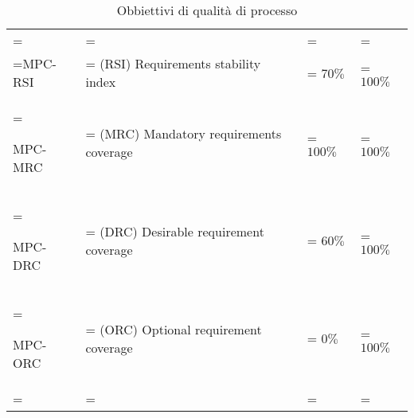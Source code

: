 \begin{xltabular}{\textwidth} {
        >{\hsize\linewidth=\hsize}X
        >{\hsize\linewidth=\hsize}X
        >{\hsize\linewidth=\hsize}X
        >{\hsize\linewidth=\hsize}X
    }
    \\

    MPC-RSI &
    (RSI) Requirements stability index  &
    $ 70\%$ &
    $ 100\%$
    \\ \hline

    MPC-MRC &
    (MRC) Mandatory requirements coverage  &
    $ 100\%$ &
    $ 100\%$
    \\ \hline

    MPC-DRC &
    (DRC) Desirable requirement coverage  &
    $ 60\%$ &
    $ 100\%$
    \\ \hline

    MPC-ORC &
    (ORC) Optional requirement coverage  &
    $ 0\%$ &
    $ 100\%$
    \\ \hline

    \caption{Obbiettivi di qualità di processo}
\end{xltabular}